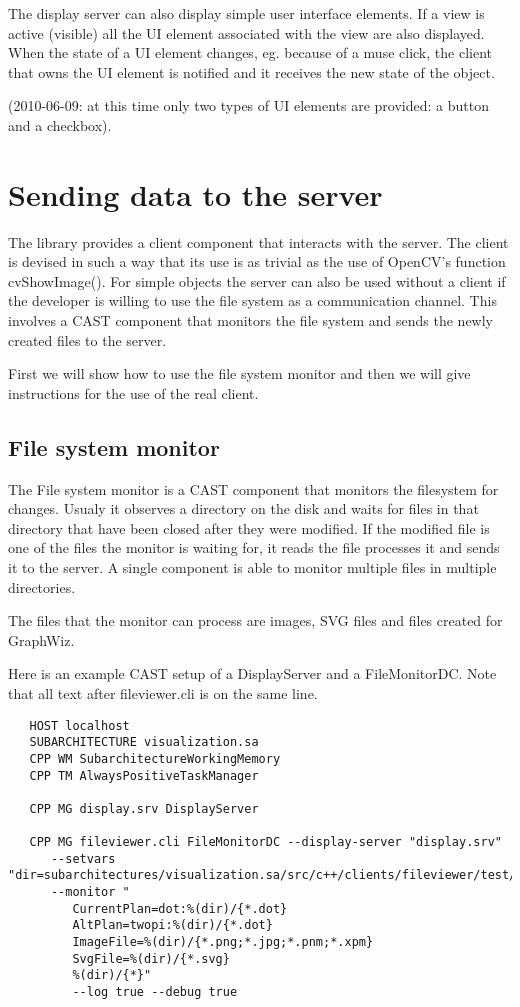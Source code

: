 The display server can also display simple user interface elements. If a view
is active (visible) all the UI element associated with the view are also
displayed. When the state of a UI element changes, eg.  because of a muse
click, the client that owns the UI element is notified and it receives the new
state of the object.

(2010-06-09: at this time only two types of UI elements are provided: a button
and a checkbox).

\section{Sending data to the server}

The library provides a client component that interacts with the server. The
client is devised in such a way that its use is as trivial as the use of
OpenCV's function cvShowImage(). For simple objects the server can also
be used without a client if the developer is willing to use the file system
as a communication channel. This involves a CAST component that monitors
the file system and sends the newly created files to the server.

First we will show how to use the file system monitor and then we will give
instructions for the use of the real client.

\subsection{File system monitor}

The File system monitor is a CAST component that monitors the filesystem for
changes. Usualy it observes a directory on the disk and waits for files in that
directory that have been closed after they were modified. If the modified file
is one of the files the monitor is waiting for, it reads the file processes it
and sends it to the server. A single component is able to monitor multiple files
in multiple directories.

The files that the monitor can process are images, SVG files and files created
for GraphWiz.

Here is an example CAST setup of a DisplayServer and a FileMonitorDC. Note that
all text after fileviewer.cli is on the same line.

\begin{verbatim}
   HOST localhost
   SUBARCHITECTURE visualization.sa 
   CPP WM SubarchitectureWorkingMemory
   CPP TM AlwaysPositiveTaskManager

   CPP MG display.srv DisplayServer

   CPP MG fileviewer.cli FileMonitorDC --display-server "display.srv"
      --setvars "dir=subarchitectures/visualization.sa/src/c++/clients/fileviewer/test/xdata"
      --monitor "
         CurrentPlan=dot:%(dir)/{*.dot}
         AltPlan=twopi:%(dir)/{*.dot}
         ImageFile=%(dir)/{*.png;*.jpg;*.pnm;*.xpm}
         SvgFile=%(dir)/{*.svg}
         %(dir)/{*}"
         --log true --debug true
\end{verbatim}

